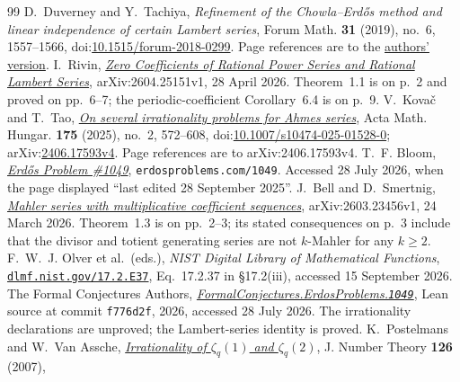 \begin{thebibliography}{99}
 D.~Duverney and Y.~Tachiya, \emph{Refinement of
  the Chowla--Erd\H{o}s method and linear independence of certain Lambert
  series}, Forum Math. \textbf{31} (2019), no.~6, 1557--1566,
  doi:\href{https://doi.org/10.1515/forum-2018-0299}{10.1515/forum-2018-0299}.
  Page references are to the
  \href{https://danielduverney.fr/documents/theorie-des-nombres/DuverneyTachiya190522.pdf}{authors'
  version}.
 I.~Rivin,
\href{https://arxiv.org/abs/2604.25151v1}{\emph{Zero Coefficients of Rational
  Power Series and Rational Lambert Series}}, arXiv:2604.25151v1,
  28 April 2026.
  Theorem~1.1 is on p.~2 and proved on pp.~6--7; the periodic-coefficient
  Corollary~6.4 is on p.~9.
 V.~Kova\v{c} and T.~Tao,
  \href{https://arxiv.org/abs/2406.17593v4}{\emph{On several irrationality
  problems for Ahmes series}}, Acta Math. Hungar. \textbf{175} (2025), no.~2,
  572--608,
  doi:\href{https://doi.org/10.1007/s10474-025-01528-0}{10.1007/s10474-025-01528-0};
  arXiv:\href{https://arxiv.org/abs/2406.17593v4}{2406.17593v4}.
  Page references are to arXiv:2406.17593v4.
 T.~F. Bloom,
  \href{https://www.erdosproblems.com/1049}{\emph{Erd\H{o}s Problem \#1049}},
  \texttt{erdosproblems.com/1049}. Accessed 28 July 2026, when the page
  displayed ``last edited 28 September 2025''.
 J.~Bell and D.~Smertnig,
  \href{https://arxiv.org/abs/2603.23456v1}{\emph{Mahler series with
  multiplicative coefficient sequences}}, arXiv:2603.23456v1,
  24 March 2026.  Theorem~1.3 is on pp.~2--3; its stated consequences on
  p.~3 include that the divisor and totient generating series are not
  $k$-Mahler for any $k\ge2$.
 F.~W.~J. Olver et al.\ (eds.), \emph{NIST Digital Library of
  Mathematical Functions},
  \href{https://dlmf.nist.gov/17.2.E37}{\texttt{dlmf.nist.gov/17.2.E37}},
  Eq.~17.2.37 in \S17.2(iii), accessed 15 September 2026.
 The Formal Conjectures Authors,
  \href{https://github.com/google-deepmind/formal-conjectures/blob/f776d2f2039351b00737ffcafb9d7d7666e1d9af/FormalConjectures/ErdosProblems/1049.lean}
  {\emph{FormalConjectures.ErdosProblems.\texttt{1049}}},
  Lean source at commit \texttt{f776d2f}, 2026, accessed 28 July 2026.  The
  irrationality declarations are unproved; the Lambert-series identity is
  proved.
 K.~Postelmans and W.~Van Assche,
  \href{https://arxiv.org/abs/math/0604312v1}{\emph{Irrationality of
  $\zeta_q(1)$ and $\zeta_q(2)$}}, J. Number Theory \textbf{126} (2007),

\end{thebibliography}
